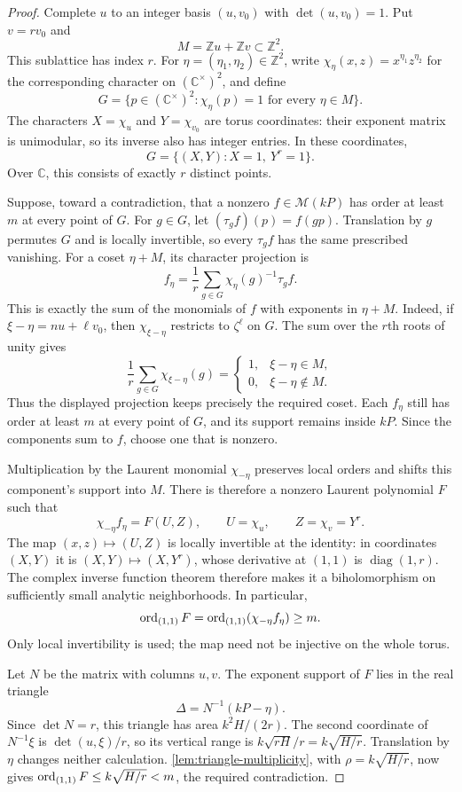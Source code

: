 \begin{proof}
Complete $u$ to an integer basis $(u,v_0)$ with $\det(u,v_0)=1$. Put $v=rv_0$ and
\[
 M=\mathbb{Z}u+\mathbb{Z}v\subset\mathbb{Z}^2.
\]
This sublattice has index $r$.  For $\eta=(\eta_1,\eta_2)\in\mathbb{Z}^2$, write $\chi_\eta(x,z)=x^{\eta_1}z^{\eta_2}$ for the corresponding character on $(\mathbb{C}^\times)^2$, and define
\[
 G=\{p\in(\mathbb{C}^\times)^2:\chi_\eta(p)=1\text{ for every }\eta\in M\}.
\]
The characters $X=\chi_u$ and $Y=\chi_{v_0}$ are torus coordinates: their exponent matrix is unimodular, so its inverse also has integer entries.  In these coordinates,
\[
 G=\{(X,Y):X=1,\ Y^r=1\}.
\]
Over $\mathbb{C}$, this consists of exactly $r$ distinct points.

Suppose, toward a contradiction, that a nonzero $f\in\mathcal{M}(kP)$ has order at least $m$ at every point of $G$. For $g\in G$, let $(\tau_gf)(p)=f(gp)$.  Translation by $g$ permutes $G$ and is locally invertible, so every $\tau_gf$ has the same prescribed vanishing.  For a coset $\eta+M$, its character projection is
\[
 f_\eta=\frac1r\sum_{g\in G}\chi_\eta(g)^{-1}\tau_gf.
\]
This is exactly the sum of the monomials of $f$ with exponents in $\eta+M$.  Indeed, if $\xi-\eta=n u+\ell v_0$, then $\chi_{\xi-\eta}$ restricts to $\zeta^\ell$ on $G$.  The sum over the $r$th roots of unity gives
\[
 \frac1r\sum_{g\in G}\chi_{\xi-\eta}(g)
 =\begin{cases}
 1,&\xi-\eta\in M,\\
 0,&\xi-\eta\notin M.
 \end{cases}
\]
Thus the displayed projection keeps precisely the required coset. Each $f_\eta$ still has order at least $m$ at every point of $G$, and its support remains inside $kP$.  Since the components sum to $f$, choose one that is nonzero.

Multiplication by the Laurent monomial $\chi_{-\eta}$ preserves local orders and shifts this component's support into $M$.  There is therefore a nonzero Laurent polynomial $F$ such that
\[
 \chi_{-\eta}f_\eta=F(U,Z),
 \qquad U=\chi_u,
 \qquad Z=\chi_v=Y^r.
\]
The map $(x,z)\mapsto(U,Z)$ is locally invertible at the identity: in coordinates $(X,Y)$ it is $(X,Y)\mapsto(X,Y^r)$, whose derivative at $(1,1)$ is $\operatorname{diag}(1,r)$.  The complex inverse function theorem therefore makes it a biholomorphism on sufficiently small analytic neighborhoods.  In particular,
\[
 \operatorname{ord}_{(1,1)}F
 =\operatorname{ord}_{(1,1)}(\chi_{-\eta}f_\eta)\geq m.
\]
Only local invertibility is used; the map need not be injective on the whole torus.

Let $N$ be the matrix with columns $u,v$.  The exponent support of $F$ lies in the real triangle
\[
 \Delta=N^{-1}(kP-\eta).
\]
Since $\det N=r$, this triangle has area $k^2H/(2r)$.  The second coordinate of $N^{-1}\xi$ is $\det(u,\xi)/r$, so its vertical range is $k\sqrt{rH}/r=k\sqrt{H/r}$.  Translation by $\eta$ changes neither calculation.  \cref{lem:triangle-multiplicity}, with $\rho=k\sqrt{H/r}$, now gives $\operatorname{ord}_{(1,1)}F\leq k\sqrt{H/r}<m$, the required contradiction.
\end{proof}

